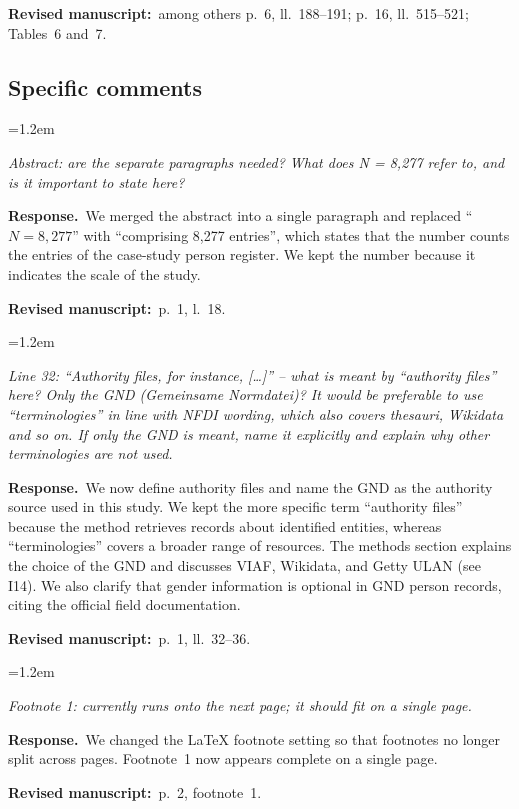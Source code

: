 \documentclass[11pt,a4paper]{article}
\newenvironment{reviewercomment}
  {\par\smallskip\begin{list}{}{\leftmargin=1.2em\rightmargin=0pt}\item[]\color{black!75}\itshape}
  {\end{list}\smallskip}
\newcommand{\response}{\par\noindent\textbf{Response.}~}
\newcommand{\where}[1]{\par\noindent\textbf{Revised manuscript:}~#1\par\medskip}
\begin{document}
\where{among others p.~6, ll.~188--191; p.~16, ll.~515--521; Tables~6 and~7.}

\subsection*{Specific comments}

\begin{enumerate}[label=\textbf{I\arabic*}, leftmargin=2.2em, itemsep=0.8em]

\item
\begin{reviewercomment}
Abstract: are the separate paragraphs needed? What does N = 8,277 refer to, and is it important to
state here?
\end{reviewercomment}
\response We merged the abstract into a single paragraph and replaced ``$N = 8{,}277$'' with
``comprising 8,277 entries'', which states that the number counts the entries of the case-study
person register. We kept the number because it indicates the scale of the study.
\where{p.~1, l.~18.}

\item
\begin{reviewercomment}
Line 32: ``Authority files, for instance, [\dots]'' -- what is meant by ``authority files'' here?
Only the GND (Gemeinsame Normdatei)? It would be preferable to use ``terminologies'' in line with NFDI
wording, which also covers thesauri, Wikidata and so on. If only the GND is meant, name it explicitly
and explain why other terminologies are not used.
\end{reviewercomment}
\response We now define authority files and name the GND as the authority source used in this study.
We kept the more specific term ``authority files'' because the method retrieves records about
identified entities, whereas ``terminologies'' covers a broader range of resources. The methods
section explains the choice of the GND and discusses VIAF, Wikidata, and Getty ULAN (see I14). We
also clarify that gender information is optional in GND person records, citing the official field
documentation.
\where{p.~1, ll.~32--36.}

\item
\begin{reviewercomment}
Footnote 1: currently runs onto the next page; it should fit on a single page.
\end{reviewercomment}
\response We changed the LaTeX footnote setting so that footnotes no longer split across pages.
Footnote~1 now appears complete on a single page.
\where{p.~2, footnote~1.}


\end{enumerate}
\end{document}
